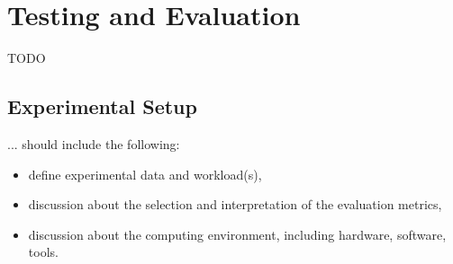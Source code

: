 \chapter{Testing and Evaluation\label{cha:chapter6}}

TODO


\section{Experimental Setup\label{sec:exp}}
... should include the following:
\begin{itemize}

\item define experimental data and workload(s),
\item discussion about the selection and interpretation of the evaluation metrics,
\item discussion about the computing environment, including hardware, software, tools.
\end{itemize}

\begingroup
\renewcommand\thesection{5.X}



